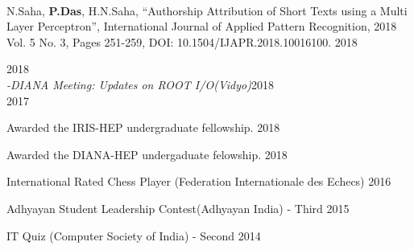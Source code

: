 \documentclass[10pt, letterpaper]{deps1}
\begin{document}
%
%
\vspace{-5pt}
\\
\vspace{-5pt}

%
%
\small{\begin{tightitemize}
    \item N.Saha, {\textbf{P.Das}}, H.N.Saha, ``Authorship Attribution of Short Texts using a Multi Layer Perceptron'', International Journal of Applied Pattern Recognition, 2018 Vol. 5 No. 3, Pages 251-259, DOI: 10.1504/IJAPR.2018.10016100. \hfill{2018}
\end{tightitemize}}

%
%
 \hfill{2018}\\ 
\hspace*{1ex}\hspace*{1ex}\hspace*{1ex}\hspace*{1ex}\hspace*{1ex}\hspace*{1ex}\hspace*{1ex}\hspace*{0.4ex}\textit{{\small {-DIANA Meeting: Updates on ROOT I/O(Vidyo)}}}\hfill{2018}\\
\hfill{2017}

%
%

%
%
\begin{tightitemize}
    \item Awarded the IRIS-HEP undergraduate fellowship. \hfill{2018}
	\item Awarded the DIANA-HEP undergaduate felowship. \hfill{2018}
	\item International Rated Chess Player (Federation Internationale des Echecs) \hfill{2016}
	\item Adhyayan Student Leadership Contest(Adhyayan India) - Third \hfill{2015}
	\item IT Quiz (Computer Society of India) - Second \hfill{2014}
\end{tightitemize}
\end{document}

